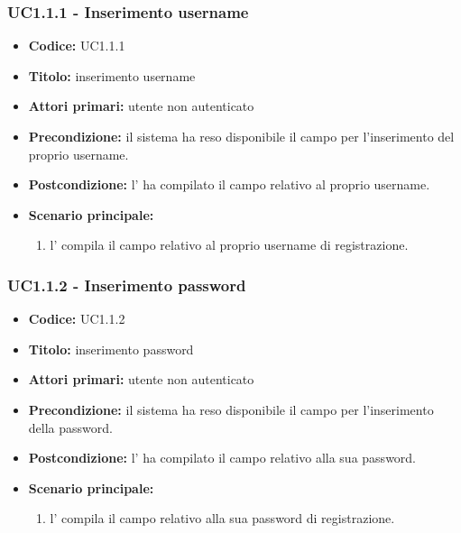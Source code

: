 \documentclass[casi-duso]{subfiles}
\begin{document}
\subsubsection{UC1.1.1 - Inserimento username}
\label{subsub:UC1.1.1}
\begin{itemize}
  \item \textbf{Codice:} UC1.1.1
  \item \textbf{Titolo:} inserimento username
  \item \textbf{Attori primari:} utente non autenticato
  \item \textbf{Precondizione:} il sistema ha reso disponibile il campo per l'inserimento del proprio username.
  \item \textbf{Postcondizione:} l' ha compilato il campo relativo al proprio username.
  \item \textbf{Scenario principale:} 
  \begin{enumerate}
    \item l' compila il campo relativo al proprio username di registrazione.  
  \end{enumerate}
\end{itemize}

\subsubsection{UC1.1.2 - Inserimento password}
\label{subsub:UC1.1.2}
\begin{itemize}
  \item \textbf{Codice:} UC1.1.2
  \item \textbf{Titolo:} inserimento password
  \item \textbf{Attori primari:} utente non autenticato
  \item \textbf{Precondizione:} il sistema ha reso disponibile il campo per l'inserimento della password.
  \item \textbf{Postcondizione:} l' ha compilato il campo relativo alla sua password.
  \item \textbf{Scenario principale:} 
  \begin{enumerate}
    \item l' compila il campo relativo alla sua password di registrazione.
  \end{enumerate}
\end{itemize}
\end{document}
